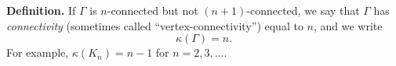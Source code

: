 \textbf{Definition.} If $\Gamma$ is $n$-connected but not $(n + 1)$-connected, we say that $\Gamma$ has \textit{connectivity} (sometimes called ``vertex-connectivity'') equal to $n$, and we write
$$\kappa(\Gamma) = n.$$
For example, $\kappa(K_n) = n - 1$ for $n = 2, 3, \ldots$.
